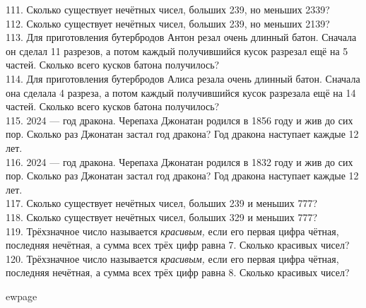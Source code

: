 111. Сколько существует нечётных чисел, больших 239, но меньших 2339?\\
112. Сколько существует нечётных чисел, больших 239, но меньших 2139?\\
113. Для приготовления бутербродов Антон резал очень длинный батон. Сначала он сделал 11 разрезов, а потом каждый получившийся кусок разрезал ещё на 5 частей. Сколько всего кусков батона получилось?\\
114. Для приготовления бутербродов Алиса резала очень длинный батон. Сначала она сделала 4 разреза, а потом каждый получившийся кусок разрезала ещё на 14 частей. Сколько всего кусков батона получилось?\\
115. 2024 --- год дракона. Черепаха Джонатан родился в 1856 году и жив до сих пор. Сколько раз Джонатан застал год дракона? Год дракона наступает каждые 12 лет.\\
116. 2024 --- год дракона. Черепаха Джонатан родился в 1832 году и жив до сих пор. Сколько раз Джонатан застал год дракона? Год дракона наступает каждые 12 лет.\\
117. Сколько существует нечётных чисел, больших 239 и меньших 777?\\
118. Сколько существует нечётных чисел, больших 329 и меньших 777?\\
119. Трёхзначное число называется {\it красивым,} если его первая цифра чётная, последняя нечётная, а сумма всех трёх цифр равна 7. Сколько красивых чисел?\\
120. Трёхзначное число называется {\it красивым,} если его первая цифра чётная, последняя нечётная, а сумма всех трёх цифр равна 8. Сколько красивых чисел?

ewpage
